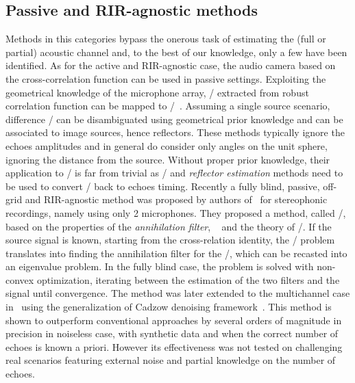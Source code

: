 \subsection{Passive and RIR-agnostic methods}
Methods in this categories bypass the onerous task of estimating the (full or partial) acoustic channel and, to the best of our knowledge, only a few have been identified.
As for the active and RIR-agnostic case, the audio camera based on the cross-correlation function can be used in passive settings.
Exploiting the geometrical knowledge of the microphone array, \TDOAs/ extracted from robust correlation function can be mapped to \DOAs/~.
Assuming a single source scenario, difference \DOAs/ can be disambiguated using geometrical prior knowledge and can be associated to image sources, hence reflectors.
These methods typically ignore the echoes amplitudes and in general do consider only angles on the unit sphere, ignoring the distance from the source.
Without proper prior knowledge, their application to \AER/ is far from trivial as \RooGE/ and \textit{reflector estimation} methods need to be used to convert \DOAs/ back to echoes timing.
\mynewline
Recently a fully blind, passive, off-grid and RIR-agnostic method was proposed by authors of~ for stereophonic recordings, namely using only 2 microphones.
They proposed a method, called \MULAN/, based on the properties of the \textit{annihilation filter},
~ and the theory of \FRI/.
If the source signal is known, starting from the cross-relation identity, the \AER/ problem translates into finding the annihilation filter for the \RIRs/, which can be recasted into an eigenvalue problem.
In the fully blind case, the problem is solved with non-convex optimization, iterating between the estimation of the two filters and the signal until convergence.
The method was later extended to the multichannel case in~ using the generalization of Cadzow denoising framework~.
This method is shown to outperform conventional approaches by several orders of magnitude in precision in noiseless case, with synthetic data and when the correct number of echoes is known a priori.
However its effectiveness was not tested on challenging real scenarios featuring external noise and partial knowledge on the number of echoes.

